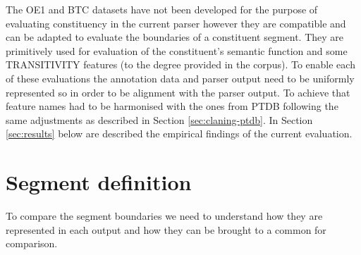 \begin{table}[!ht]
    \centering
    \caption{Evaluation corpus summary}
    \label{tab:corpus-sumary}
\end{table}

The OE1 and BTC datasets have not been developed for the purpose of evaluating constituency in the current parser however they are compatible and can be adapted to evaluate the boundaries of a constituent segment. They are primitively used for evaluation of the constituent's semantic function and some TRANSITIVITY features (to the degree provided in the corpus). To enable each of these evaluations the annotation data and parser output need to be uniformly represented so in order to be alignment with the parser output. To achieve that feature names had to be harmonised with the ones from PTDB following the same adjustments as described in Section \ref{sec:claning-ptdb}. In Section \ref{sec:results} below are described the empirical findings of the current evaluation.

\section{Segment definition}
To compare the segment boundaries we need to understand how they are represented in each output and how they can be brought to a common for comparison. 

